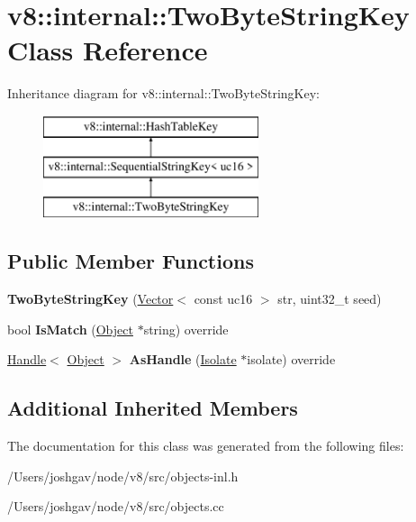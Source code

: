 \hypertarget{classv8_1_1internal_1_1_two_byte_string_key}{}\section{v8\+:\+:internal\+:\+:Two\+Byte\+String\+Key Class Reference}
\label{classv8_1_1internal_1_1_two_byte_string_key}
Inheritance diagram for v8\+:\+:internal\+:\+:Two\+Byte\+String\+Key\+:\begin{figure}[H]
\begin{center}
\leavevmode
\includegraphics[height=3.000000cm]{classv8_1_1internal_1_1_two_byte_string_key}
\end{center}
\end{figure}
\subsection*{Public Member Functions}
\begin{DoxyCompactItemize}
\item 
{\bfseries Two\+Byte\+String\+Key} (\hyperlink{classv8_1_1internal_1_1_vector}{Vector}$<$ const uc16 $>$ str, uint32\+\_\+t seed)\hypertarget{classv8_1_1internal_1_1_two_byte_string_key_ad3b10f868f603fcd025ee048912b940d}{}\label{classv8_1_1internal_1_1_two_byte_string_key_ad3b10f868f603fcd025ee048912b940d}

\item 
bool {\bfseries Is\+Match} (\hyperlink{classv8_1_1internal_1_1_object}{Object} $\ast$string) override\hypertarget{classv8_1_1internal_1_1_two_byte_string_key_a617f823ad3031de2c96c242ea55d1cc0}{}\label{classv8_1_1internal_1_1_two_byte_string_key_a617f823ad3031de2c96c242ea55d1cc0}

\item 
\hyperlink{classv8_1_1internal_1_1_handle}{Handle}$<$ \hyperlink{classv8_1_1internal_1_1_object}{Object} $>$ {\bfseries As\+Handle} (\hyperlink{classv8_1_1internal_1_1_isolate}{Isolate} $\ast$isolate) override\hypertarget{classv8_1_1internal_1_1_two_byte_string_key_a1e8f4b2d7a3e8a7be686172fa227b4a5}{}\label{classv8_1_1internal_1_1_two_byte_string_key_a1e8f4b2d7a3e8a7be686172fa227b4a5}

\end{DoxyCompactItemize}
\subsection*{Additional Inherited Members}


The documentation for this class was generated from the following files\+:\begin{DoxyCompactItemize}
\item 
/\+Users/joshgav/node/v8/src/objects-\/inl.\+h\item 
/\+Users/joshgav/node/v8/src/objects.\+cc\end{DoxyCompactItemize}

